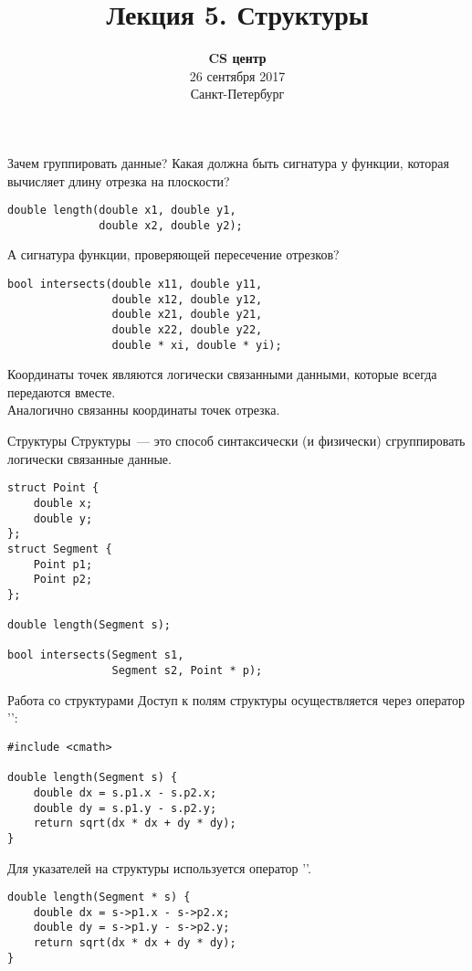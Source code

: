 \documentclass{beamer}
\title{Лекция 5. Структуры}
\date{
   \textbf{CS центр}\\
   26 сентября 2017 \\
   Санкт-Петербург
}
\begin{document}
\begin{frame} 
  \titlepage
\end{frame}

\begin{frame}[fragile]{Зачем группировать данные?}
    Какая должна быть сигнатура у функции, которая вычисляет длину отрезка на
    плоскости?
\begin{lstlisting}
double length(double x1, double y1, 
              double x2, double y2);
\end{lstlisting}
    А сигнатура функции, проверяющей пересечение отрезков?
\begin{lstlisting}
bool intersects(double x11, double y11, 
                double x12, double y12,
                double x21, double y21, 
                double x22, double y22,
                double * xi, double * yi);
\end{lstlisting}
Координаты точек являются логически связанными данными, которые всегда передаются
вместе.\\
Аналогично связанны координаты точек отрезка.
\end{frame}

\begin{frame}[fragile]{Структуры}
    Структуры~--- это способ синтаксически (и физически)
    сгруппировать логически связанные данные.
\begin{lstlisting}
struct Point {
    double x;
    double y;
};
struct Segment {
    Point p1;
    Point p2;
};

double length(Segment s);  

bool intersects(Segment s1, 
                Segment s2, Point * p);
\end{lstlisting}
\end{frame}

\begin{frame}[fragile]{Работа со структурами}
Доступ к полям структуры осуществляется через
оператор '':
\begin{lstlisting}
#include <cmath>

double length(Segment s) {
    double dx = s.p1.x - s.p2.x;
    double dy = s.p1.y - s.p2.y;
    return sqrt(dx * dx + dy * dy);
}
\end{lstlisting}
Для указателей на структуры используется оператор '\code{->}'.
\begin{lstlisting}
double length(Segment * s) {
    double dx = s->p1.x - s->p2.x;
    double dy = s->p1.y - s->p2.y;
    return sqrt(dx * dx + dy * dy);
}
\end{lstlisting}
\end{frame}
\end{document}
